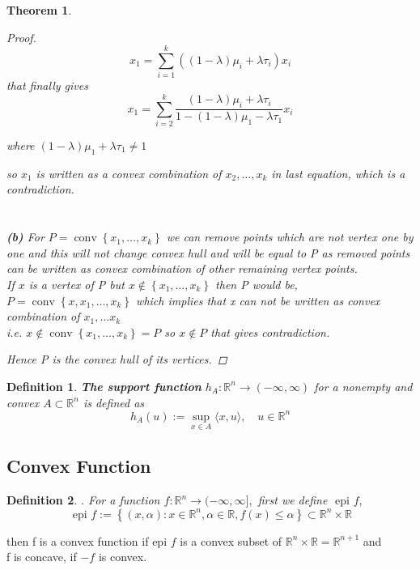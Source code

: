 \documentclass[oneside]{book}
\newtheorem{theorem}{Theorem}[section]
\newtheorem{mydef}{Definition}
\begin{document}
\begin{theorem}
\begin{proof}
\begin{equation} 
x_{1}=\sum_{i=1}^{k}\left((1-\lambda) \mu_{i}+\lambda \tau_{i}\right) x_{i}
\end{equation}
that finally gives 
\begin{equation} 
x_{1}=\sum_{i=2}^{k} \frac{(1-\lambda) \mu_{i}+\lambda \tau_{i}}{1-(1-\lambda) \mu_{1}-\lambda \tau_{1}} x_{i}
\end{equation}

where $(1-\lambda) \mu_{1}+\lambda \tau_{1} \neq 1$ \par
 so $x_{1}$ is written as a convex combination of $x_{2}, \ldots, x_{k}$ in last equation, which is  a contradiction.
\\\\\\
\textbf{(b)}  For $P=\operatorname{conv}\left\{x_{1}, \ldots, x_{k}\right\}$ we can remove points  which are not vertex  
one by one and this will not change convex hull and will be equal to P as removed points can be written as convex combination of other remaining vertex points. \\
If $x$ is a vertex of P but $x \notin \left\{x_{1}, \ldots, x_{k}\right\} $ then P would be,
$P=\operatorname{conv}\left\{x,x_{1}, \ldots, x_{k}\right\}$ 
which implies that x can not be written as convex combination of $x_{1}, \ldots x_{k}$ \\ i.e. 
 $x \notin  \operatorname{conv} \left\{x_{1}, \ldots, x_{k}\right\} = P  $ so $x \notin P$ that gives contradiction.\par
 Hence P is the convex hull of its vertices.
\end{proof}


\end{theorem}


\begin{mydef}
 \textbf{The support function }$h_{A}: \mathbb{R}^{n} \rightarrow(-\infty, \infty) $  for a nonempty and convex $A \subset \mathbb{R}^{n}$ is defined as
$$
h_{A}(u):=\sup _{x \in A}\langle x, u\rangle, \quad u \in \mathbb{R}^{n}
$$

\end{mydef}



\subsection{Convex Function}



\begin{mydef}. 
For a function   $f: \mathbb{R}^{n} \rightarrow(-\infty, \infty],$ first we define $\text { epi } f, $  
\begin{equation}
\text { epi } f:=\left\{(x, \alpha): x \in \mathbb{R}^{n}, \alpha \in \mathbb{R}, f(x) \leq \alpha\right\} \subset \mathbb{R}^{n} \times \mathbb{R} 
\end{equation}
\end{mydef}
  then f is a convex function if epi $f$ is a convex subset of $\mathbb{R}^{n} \times \mathbb{R}=\mathbb{R}^{n+1}$  and \\  f is concave, if $-f$ is convex. 
  
\end{document}
